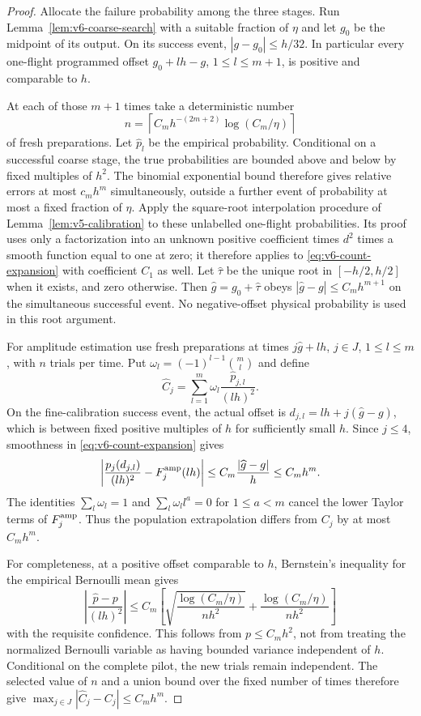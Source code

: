 \begin{proof}
Allocate the failure probability among the three stages. Run
Lemma~\ref{lem:v6-coarse-search} with a suitable fraction of $\eta$
and let $g_0$ be the midpoint of its output. On its success event,
$|g-g_0|\le h/32$. In particular every one-flight programmed offset
$g_0+lh-g$, $1\le l\le m+1$, is positive and comparable to $h$.

At each of those $m+1$ times take a deterministic number
\[
 n=\left\lceil C_mh^{-(2m+2)}\log(C_m/\eta)\right\rceil
\]
of fresh preparations. Let $\widehat p_l$ be the empirical probability.
Conditional on a successful coarse stage, the true probabilities are
bounded above and below by fixed multiples of $h^2$. The binomial
exponential bound therefore gives relative errors at most $c_mh^m$
simultaneously, outside a further event of probability at most a fixed
fraction of $\eta$. Apply the square-root interpolation procedure of
Lemma~\ref{lem:v5-calibration} to these unlabelled one-flight
probabilities. Its proof uses only a factorization into an unknown
positive coefficient times $d^2$ times a smooth function equal to one
at zero; it therefore applies to \eqref{eq:v6-count-expansion} with
coefficient $C_1$ as well. Let $\widehat\tau$ be the unique root in
$[-h/2,h/2]$ when it exists, and zero otherwise. Then
$\widehat g=g_0+\widehat\tau$ obeys
$|\widehat g-g|\le C_mh^{m+1}$ on the simultaneous successful event.
No negative-offset physical probability is used in this root argument.

For amplitude estimation use fresh preparations at times
$j\widehat g+lh$, $j\in J$, $1\le l\le m$, with $n$ trials per time.
Put $\omega_l=(-1)^{l-1}\binom ml$ and define
\[
 \widehat C_j=\sum_{l=1}^m\omega_l
 \frac{\widehat p_{j,l}}{(lh)^2}.
\]
On the fine-calibration success event, the actual offset is
$d_{j,l}=lh+j(\widehat g-g)$, which is between fixed positive
multiples of $h$ for sufficiently small $h$. Since $j\le4$, smoothness
in \eqref{eq:v6-count-expansion} gives
\[
 \left|\frac{p_j(d_{j,l})}{(lh)^2}-F_j^{\rm amp}(lh)\right|
       \le C_m\frac{|\widehat g-g|}{h}\le C_mh^m.
\]
The identities $\sum_l\omega_l=1$ and
$\sum_l\omega_l l^a=0$ for $1\le a<m$ cancel the lower Taylor terms
of $F_j^{\rm amp}$. Thus the population extrapolation differs from
$C_j$ by at most $C_mh^m$.

For completeness, at a positive offset comparable to $h$, Bernstein's
inequality for the empirical Bernoulli mean gives
\[
 \left|\frac{\widehat p-p}{(lh)^2}\right|
 \le C_m\left[
 \sqrt{\frac{\log(C_m/\eta)}{nh^2}}
 +\frac{\log(C_m/\eta)}{nh^2}\right]
\]
with the requisite confidence. This follows from $p\le C_mh^2$,
not from treating the normalized Bernoulli variable as having bounded
variance independent of $h$. Conditional on the complete pilot, the
new trials remain independent. The selected value of $n$ and a union
bound over the fixed number of times therefore give
$\max_{j\in J}|\widehat C_j-C_j|\le C_mh^m$.


\end{proof}
